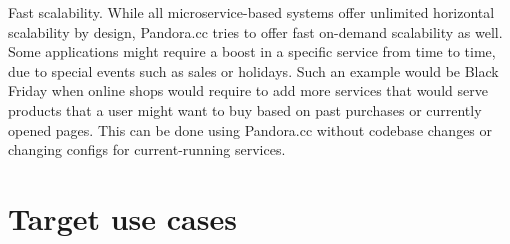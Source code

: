Fast scalability. While all microservice-based systems offer unlimited horizontal scalability by design, Pandora.cc tries to offer fast on-demand scalability as well. Some applications might require a boost in a specific service from time to time, due to special events such as sales or holidays. Such an example would be Black Friday when online shops would require to add more services that would serve products that a user might want to buy based on past purchases or currently opened pages. This can be done using Pandora.cc without codebase changes or changing configs for current-running services.


\section{Target use cases}

